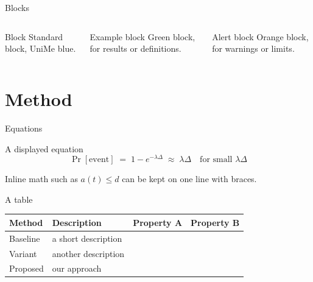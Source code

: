 \documentclass[aspectratio=169,10pt]{beamer}
\newcommand{\yes}{\textcolor{unimegreen!70!black}{\ding{51}}}
\newcommand{\no}{\textcolor{unimered}{\ding{55}}}
\begin{document}
\begin{frame}{Blocks}
\begin{columns}[t]
\begin{block}{Block}
Standard block, UniMe blue.
\end{block}
\begin{exampleblock}{Example block}
Green block, for results or definitions.
\end{exampleblock}
\begin{alertblock}{Alert block}
Orange block, for warnings or limits.
\end{alertblock}
\end{columns}
\vspace{0.4cm}
\begin{center}
\end{center}
\end{frame}

\section{Method}

\begin{frame}{Equations}
\begin{block}{A displayed equation}
\[ \Pr[\text{event}] \;=\; 1-e^{-\lambda\Delta} \;\approx\; \lambda\Delta \quad \text{for small } \lambda\Delta \]
\end{block}
Inline math such as ${a(t)\le d}$ can be kept on one line with braces.
\end{frame}

\begin{frame}{A table}
\begin{center}
\footnotesize
\renewcommand{\arraystretch}{1.2}
\begin{tabularx}{0.85\textwidth}{@{}lYcc@{}}
\toprule
\textbf{Method} & \textbf{Description} & \textbf{Property A} & \textbf{Property B} \\
\midrule
Baseline & a short description & \no & \no \\
Variant & another description & \yes & \no \\
Proposed & our approach & \yes & \yes \\
\bottomrule
\end{tabularx}
\end{center}
\end{frame}
\end{document}
